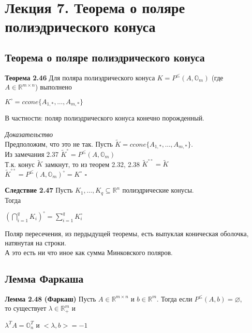 \section{Лекция 7. Теорема о поляре полиэдрического конуса}
\subsection{Теорема о поляре полиэдрического конуса}
{\bf Теорема 2.46}
Для поляра полиэдрического конуса $K=P^{\le}(A,\mathbb{O}_m)$ (где $A \in \mathbb{R}^{m \times n}$) выполнено
\begin{center} $K^{\circ}=ccone\{A_{1,*}, \dots, A_{m,*}\}$ \end{center}
В частности: поляр полиэдрического конуса конечно порожденный.

{\it Доказательство}\\
Предположим, что это не так. Пусть $\tilde K =ccone\{A_{1,*}, \dots , A_{m,*}\}$. \\
Из замечания 2.37 ${\tilde K}^{\circ}=P^{\le}(A, \mathbb{O}_m)$\\
Т.к. конус ${\tilde K}$ замкнут, то из теорем 2.32, 2.38 ${\tilde K}^{\circ \circ}=\tilde K$\\
${\tilde K}^{\circ \circ}=P^{\le}(A,\mathbb{O}_m)^{\circ}=K^{\circ}$
$\square$

{\bf Следствие 2.47}
Пусть $K_1, \dots , K_q \subseteq \mathbb{R}^n$ полиэдрические конусы. \\Тогда
\begin{center}
$(\bigcap_{i=1}^q K_i)^{\circ} = \sum_{i=1}^q K_i^{\circ}$
\end{center}
Поляр пересечения, из пердыдущей теоремы, есть выпуклая коническая оболочка, натянутая на строки.\\
А это есть ни что иное как сумма Минковского поляров.
\subsection{Лемма Фаркаша}
{\bf Лемма 2.48 (Фаркаш)}
Пусть $A \in \mathbb{R}^{m \times n}$ и $b \in \mathbb{R}^m$. Тогда если $P^{\le}
(A, b) = \varnothing $, то существует $ \lambda \in \mathbb{R}_{+}^m $ и
\begin{center} $\lambda^TA=\mathbb{O}_n^T$ и $<\lambda, b>=-1$ \end{center}

